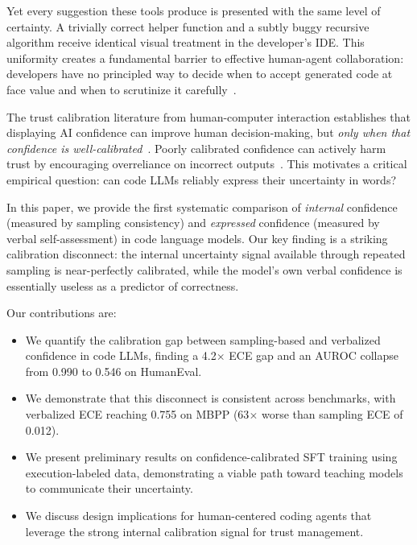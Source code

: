 \documentclass{article}
\begin{document}
Yet every suggestion these tools produce is presented with the same level of certainty. A trivially correct helper function and a subtly buggy recursive algorithm receive identical visual treatment in the developer's IDE. This uniformity creates a fundamental barrier to effective human-agent collaboration: developers have no principled way to decide when to accept generated code at face value and when to scrutinize it carefully~\citep{vaithilingam2022expectation, mozannar2024reading}.

The trust calibration literature from human-computer interaction establishes that displaying AI confidence can improve human decision-making, but \emph{only when that confidence is well-calibrated}~\citep{yin2019understanding, zhang2020effect}. Poorly calibrated confidence can actively harm trust by encouraging overreliance on incorrect outputs~\citep{rechkemmer2022confidence, bansal2021does}. This motivates a critical empirical question: can code LLMs reliably express their uncertainty in words?

In this paper, we provide the first systematic comparison of \emph{internal} confidence (measured by sampling consistency) and \emph{expressed} confidence (measured by verbal self-assessment) in code language models. Our key finding is a striking calibration disconnect: the internal uncertainty signal available through repeated sampling is near-perfectly calibrated, while the model's own verbal confidence is essentially useless as a predictor of correctness.

Our contributions are:
\begin{itemize}
  \item We quantify the calibration gap between sampling-based and verbalized confidence in code LLMs, finding a 4.2$\times$ ECE gap and an AUROC collapse from 0.990 to 0.546 on HumanEval.
  \item We demonstrate that this disconnect is consistent across benchmarks, with verbalized ECE reaching 0.755 on MBPP (63$\times$ worse than sampling ECE of 0.012).
  \item We present preliminary results on confidence-calibrated SFT training using execution-labeled data, demonstrating a viable path toward teaching models to communicate their uncertainty.
  \item We discuss design implications for human-centered coding agents that leverage the strong internal calibration signal for trust management.
\end{itemize}
\end{document}

